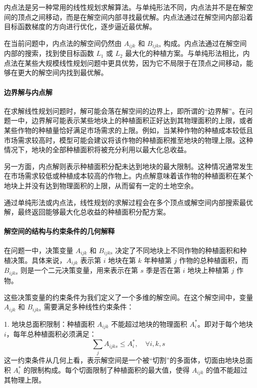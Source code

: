 \documentclass[12pt,a4paper]{nmmcm}
\begin{document}
内点法是另一种常用的线性规划求解算法。与单纯形法不同，内点法并不是在解空间的顶点之间移动，而是在解空间内部寻找最优解。内点法通过在解空间内部沿着目标函数梯度的方向进行优化，逐步逼近最优解。

在当前问题中，内点法的解空间仍然由 $A_{ijk}$ 和 $B_{ijks}$ 构成。内点法通过在解空间内部的搜索，找到使目标函数 $L_1$ 或 $L_2$ 最大化的种植方案。与单纯形法相比，内点法在某些大规模线性规划问题中更具优势，因为它不局限于在顶点之间移动，能够在更大的解空间内找到最优解。

\paragraph{边界解与内点解}

在求解线性规划问题时，解可能会落在解空间的边界上，即所谓的“边界解”。在问题一中，边界解可能表示某些地块上的种植面积正好达到其物理面积的上限，或者某些作物的种植量恰好满足市场需求的上限。例如，当某种作物的种植成本较低且市场需求较高时，模型可能会建议将该作物的种植面积推至地块的物理上限。这种情况下，地块的全部种植面积将被充分利用以最大化总收益。

另一方面，内点解则表示种植面积分配未达到地块的最大限制。这种情况通常发生在市场需求较低或种植成本较高的作物上。内点解意味着该作物的种植面积在某个地块上并没有达到物理面积的上限，从而留有一定的土地空余。

通过单纯形法或内点法，线性规划的求解过程会在多个顶点或解空间内部搜索最优解，最终返回能够最大化总收益的种植面积分配方案。


\paragraph{解空间的结构与约束条件的几何解释}

在问题一中，决策变量 $A_{ijk}$ 和 $B_{ijks}$ 决定了不同地块上不同作物的种植面积和种植决策。具体来说，$A_{ijk}$ 表示第 $i$ 地块在第 $k$ 年种植第 $j$ 作物的总种植面积，而 $B_{ijks}$ 则是一个二元决策变量，用来表示在第 $s$ 季是否在第 $i$ 地块上种植第 $j$ 作物。

这些决策变量的约束条件为我们定义了一个多维的解空间。在这个解空间中，变量 $A_{ijk}$ 和 $B_{ijks}$ 需要满足多种线性约束条件：

1. 地块总面积限制：种植面积 $A_{ijk}$ 不能超过地块的物理面积 $A_i^*$。即对于每个地块 $i$，每年总种植面积必须满足：
\[
  \sum_j A_{ijks} \leq A_i^*, \quad \forall i, k, s
\]
这一约束条件从几何上看，表示解空间是一个被“切割”的多面体，切面由地块总面积 $A_i^*$ 的限制构成。每个切面限制了种植面积的最大值，使得 $A_{ijk}$ 的值不能超过其物理上限。
\end{document}
